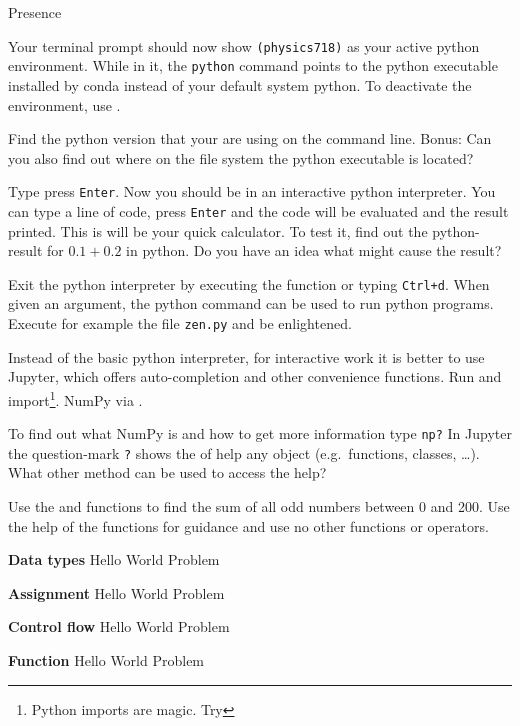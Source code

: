 \documentclass[a4paper]{article}
\begin{document}
\begin{exam}[Presence]{Presence}
\begin{instructions}
\begin{problem*}
      Your terminal prompt should now show \texttt{(physics718)} as your active
      python environment. While in it, the \texttt{python} command points
      to the python executable installed by conda instead of your default system
      python. To deactivate the environment, use .

      \begin{parts}
        \item Find the python version that your are using on the command line.
          Bonus: Can you also find out where on the file system the python executable is located?
        \item Type  press \texttt{Enter}. Now you should be in an
          interactive python interpreter. You can type a line of code, press
          \texttt{Enter} and the code will be evaluated and the result printed.
          This is will be your quick calculator. To test it, find out the python-result for
          $0.1 + 0.2$ in python. Do you have an idea what might cause the
          result?
        \item Exit the python interpreter by executing the  function or typing
          \texttt{Ctrl+d}. When given an argument, the python command can be used to run
          python programs. Execute for example the file \texttt{zen.py} and be enlightened.
        \item Instead of the basic python interpreter, for interactive work it
          is better to use Jupyter, which offers auto-completion and other
          convenience functions. Run 
          and import\footnote{Python imports are magic. Try }. NumPy via .

          To find out what NumPy is and how to get more information type \texttt{np?}
          In Jupyter the question-mark  \texttt{?} shows the
           of help any object (e.g.\ functions, classes, \ldots). What other method can be used to access the help?
        \item Use the  and  functions to find the sum of all odd numbers between 0
          and 200. Use the help of the functions for guidance and use no other functions or operators.
      \end{parts}
    \end{problem*}

  \end{instructions}
  \begin{problem}\textbf{Data types}
    Hello World Problem
  \end{problem}
  \begin{problem}\textbf{Assignment}
    Hello World Problem
  \end{problem}
  \begin{problem}\textbf{Control flow}
    Hello World Problem
  \end{problem}
  \begin{problem}\textbf{Function}
    Hello World Problem
  \end{problem}
\end{exam}
\end{document}
